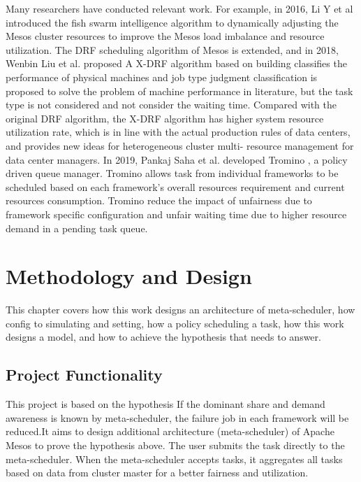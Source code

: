 \documentclass[12pt,oneside,openright,a4paper]{cpe-english-project}
\begin{document}
\hspace{10mm}Many researchers have conducted relevant work. For example, in 2016, Li Y et al \cite{fishSwarm} introduced the fish swarm intelligence algorithm to dynamically adjusting the Mesos cluster resources to improve the Mesos load imbalance and resource utilization. The DRF scheduling algorithm of Mesos is extended, and in 2018, Wenbin Liu et al. proposed A X-DRF algorithm \cite{xdrf} based on building classifies the performance of physical machines and job type judgment classification is proposed to solve the problem of machine performance in literature, but the task type is not considered and not consider the waiting time. Compared with the original DRF algorithm, the X-DRF algorithm has higher system resource utilization rate, which is in line with the actual production rules of data centers, and provides new ideas for heterogeneous cluster multi- resource management for data center managers. In 2019, Pankaj Saha et al. developed Tromino \cite{tromino}, a policy driven queue manager. Tromino allows task from individual frameworks to be scheduled based on each framework’s overall resources requirement and current resources consumption. Tromino reduce the impact of unfairness due to framework specific configuration and unfair waiting time due to higher resource demand in a pending task queue.

\chapter{Methodology and Design}

\hspace{10mm}This chapter covers how this work designs an architecture of meta-scheduler, how config to simulating and setting, how a policy scheduling a task, how this work designs a model, and how to achieve the hypothesis that needs to answer.

\section{Project Functionality}
\hspace{10mm}This project is based on the hypothesis If the dominant share and demand awareness is known by meta-scheduler, the failure job in each framework will be reduced.It aims to design additional architecture (meta-scheduler) of Apache Mesos to prove the hypothesis above. The user submits the task directly to the meta-scheduler. When the meta-scheduler accepts tasks, it aggregates all tasks based on data from cluster master for a better fairness and utilization.
\end{document}
